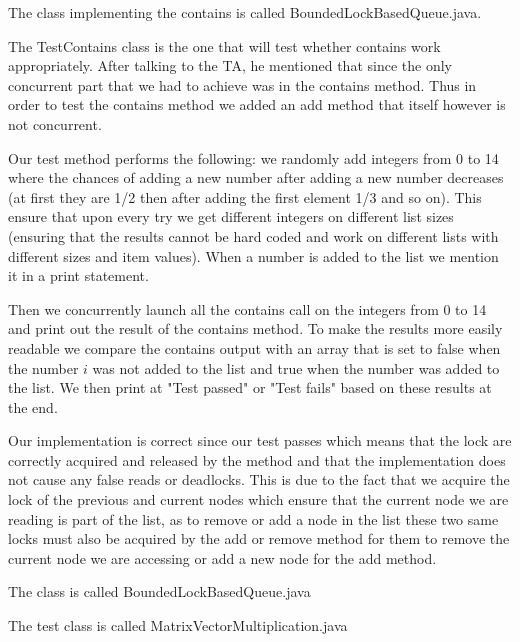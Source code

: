 \documentclass[11pt,letterpaper]{exam}
\begin{document}
\begin{questions}
		\question 
			The class implementing the contains is called BoundedLockBasedQueue.java.
			
			The TestContains class is the one that will test whether contains work appropriately. After talking to the TA, he mentioned that since the only concurrent part that we had to achieve was in the contains method. Thus in order to test the contains method we added an add method that itself however is not concurrent.
			
			Our test method performs the following: we randomly add integers from 0 to 14 where the chances of adding a new number after adding a new number decreases (at first they are 1/2 then after adding the first element 1/3 and so on). This ensure that upon every try we get different integers on different list sizes (ensuring that the results cannot be hard coded and work on different lists with different sizes and item values). When a number is added to the list we mention it in a print statement. 
			
			Then we concurrently launch all the contains call on the integers from 0 to 14 and print out the result of the contains method. To make the results more easily readable we compare the contains output with an array that is set to false when the number $i$ was not added to the list and true when the number was added to the list. We then print at "Test passed" or "Test fails" based on these results at the end. 
			
			Our implementation is correct since our test passes which means that the lock are correctly acquired and released by the method and that the implementation does not cause any false reads or deadlocks. This is due to the fact that we acquire the lock of the previous and current nodes which ensure that the current node we are reading is part of the list, as to remove or add a node in the list these two same locks must also be acquired by the add or remove method for them to remove the current node we are accessing or add a new node for the add method.
			
		\question 
			The class is called BoundedLockBasedQueue.java
			\begin{parts}
				\setcounter{partno}{1}
				\part
			\end{parts}
		\question
			The test class is called MatrixVectorMultiplication.java
			\begin{parts}
				\setcounter{partno}{2}

\end{parts}
\end{questions}
\end{document}

